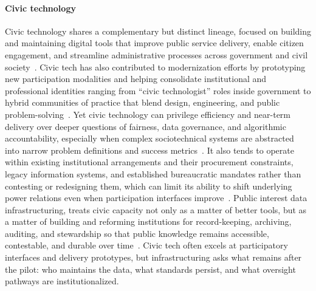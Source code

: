 \documentclass[acmsmall,screen]{acmart}
\begin{document}
\paragraph*{Civic technology}
Civic technology shares a complementary but distinct lineage, focused on building and maintaining digital tools that improve public service delivery, enable citizen engagement, and streamline administrative processes across government and civil society~\cite{boehnerDataDesignCivics2016,aragonCivicTechnologiesResearch2020,ruijerConnectingSocietalIssues2017}. Civic tech has also contributed to modernization efforts by prototyping new participation modalities and helping consolidate institutional and professional identities ranging from ``civic technologist'' roles inside government to hybrid communities of practice that blend design, engineering, and public problem-solving~\cite{aragonCivicTechnologiesResearch2020,matias_civic_2019,riderBuildingIdealWorkplaces2022}. Yet civic technology can privilege efficiency and near-term delivery over deeper questions of fairness, data governance, and algorithmic accountability, especially when complex sociotechnical systems are abstracted into narrow problem definitions and success metrics~\cite{selbst2019fairness,hutchinsonAccountabilityMachineLearning2021,paakkonenBureaucracyLensAnalyzing2020b}. It also tends to operate within existing institutional arrangements and their procurement constraints, legacy information systems, and established bureaucratic mandates rather than contesting or redesigning them, which can limit its ability to shift underlying power relations even when participation interfaces improve~\cite{kimDigitalGovernmentWicked2016,gil-garciaDigitalGovernmentPublic2018,ruijerConnectingSocietalIssues2017}. Public interest data infrastructuring, treats civic capacity not only as a matter of better tools, but as a matter of building and reforming institutions for record-keeping, archiving, auditing, and stewardship so that public knowledge remains accessible, contestable, and durable over time~\cite{acker_DataCraftTheory_2019,schwartz_archives_2002,hutchinsonAccountabilityMachineLearning2021}. Civic tech often excels at participatory interfaces and delivery prototypes, but infrastructuring asks what remains after the pilot: who maintains the data, what standards persist, and what oversight pathways are institutionalized.
\end{document}
